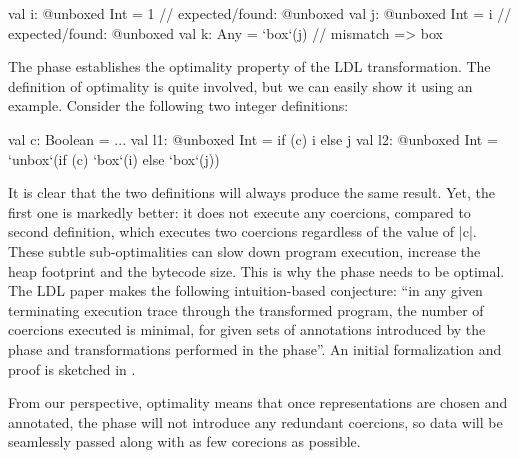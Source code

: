 
\begin{lstlisting-nobreak}
val i: @unboxed Int = 1 // expected/found: @unboxed
val j: @unboxed Int = i // expected/found: @unboxed
val k: Any = `box`(j)             // mismatch => box
\end{lstlisting-nobreak}

The \coerce{} phase establishes the optimality property of the LDL
transformation. The definition of optimality is quite involved,
but we can easily show it using an example.
Consider the following two integer definitions:

\begin{lstlisting-nobreak}
val c: Boolean = ...
val l1: @unboxed Int = if (c) i else j
val l2: @unboxed Int = `unbox`(if (c) `box`(i) else `box`(j))
\end{lstlisting-nobreak}

It is clear that the two definitions will always produce the same
result. Yet, the first one is markedly better: it does not execute
any coercions, compared to second definition, which executes two
coercions regardless of the value of |c|. These subtle
sub-optimalities can slow down program execution, increase the heap
footprint and the bytecode size. This is why the \coerce{} phase needs
to be optimal. The LDL paper \cite{ldl} makes the following
intuition-based conjecture: ``in any given terminating
execution trace through the transformed program, the number of
coercions executed is minimal,
for given sets of annotations introduced by
the \inject{} phase and transformations performed in the \commit{}
phase''. An initial formalization and proof is sketched in \cite{ldl-form}.

From our perspective, optimality means that once representations are chosen and annotated,
the \coerce{} phase will not introduce any redundant coercions, so data will be seamlessly passed along with as few corecions as possible.

